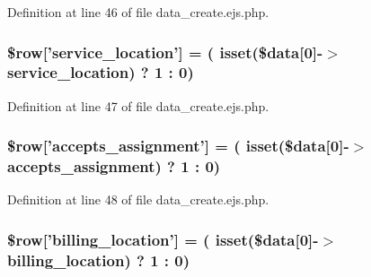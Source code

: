 \-Definition at line 46 of file data\-\_\-create.\-ejs.\-php.

\hypertarget{patientfile_2immnunization_2data__create_8ejs_8php_abb2e5d696b624c8bca263c29503b7350}{
\subsubsection[{\$row}]{\setlength{\rightskip}{0pt plus 5cm}\$row\mbox{[}'service\-\_\-location'\mbox{]} = ( isset(\$data\mbox{[}0\mbox{]}-\/$>$service\-\_\-location) ? 1 \-: 0)}}\label{patientfile_2immnunization_2data__create_8ejs_8php_abb2e5d696b624c8bca263c29503b7350}


\-Definition at line 47 of file data\-\_\-create.\-ejs.\-php.

\hypertarget{patientfile_2immnunization_2data__create_8ejs_8php_a11d3455aa396c9c69454f3e6fad3ec6c}{
\subsubsection[{\$row}]{\setlength{\rightskip}{0pt plus 5cm}\$row\mbox{[}'accepts\-\_\-assignment'\mbox{]} = ( isset(\$data\mbox{[}0\mbox{]}-\/$>$accepts\-\_\-assignment) ? 1 \-: 0)}}\label{patientfile_2immnunization_2data__create_8ejs_8php_a11d3455aa396c9c69454f3e6fad3ec6c}


\-Definition at line 48 of file data\-\_\-create.\-ejs.\-php.

\hypertarget{patientfile_2immnunization_2data__create_8ejs_8php_a65028e126c36dd80a9536adb4a71e013}{
\subsubsection[{\$row}]{\setlength{\rightskip}{0pt plus 5cm}\$row\mbox{[}'billing\-\_\-location'\mbox{]} = ( isset(\$data\mbox{[}0\mbox{]}-\/$>$billing\-\_\-location) ? 1 \-: 0)}}\label{patientfile_2immnunization_2data__create_8ejs_8php_a65028e126c36dd80a9536adb4a71e013}



